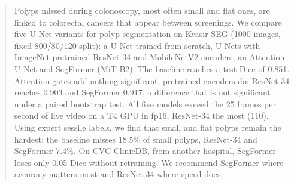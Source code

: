 \begin{abstract}
Polyps missed during colonoscopy, most often small and flat ones, are linked to colorectal cancers that appear
between screenings. We compare five U-Net variants for polyp segmentation on Kvasir-SEG (1000 images, fixed
800/80/120 split): a U-Net trained from scratch, U-Nets with ImageNet-pretrained ResNet-34 and MobileNetV2
encoders, an Attention U-Net and SegFormer (MiT-B2). The baseline reaches a test Dice of 0.851. Attention gates
add nothing significant; pretrained encoders do: ResNet-34 reaches 0.903 and SegFormer 0.917, a difference that is
not significant under a paired bootstrap test. All five models exceed the 25 frames per second of live video on a
T4 GPU in fp16, ResNet-34 the most (110). Using expert sessile labels, we find that small and flat polyps remain the
hardest: the baseline misses 18.5\% of small polyps, ResNet-34 and SegFormer 7.4\%. On CVC-ClinicDB, from another
hospital, SegFormer loses only 0.05 Dice without retraining. We recommend SegFormer where accuracy matters most and
ResNet-34 where speed does.
\end{abstract}

